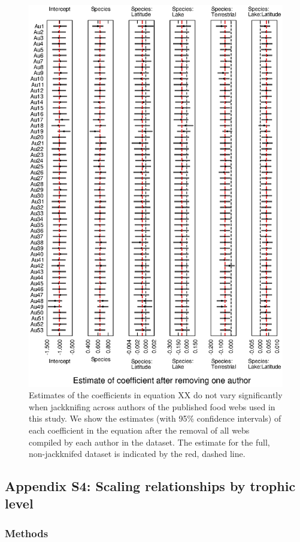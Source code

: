 \documentclass[12pt]{article}
\begin{document}
    \begin{figure}[h]
    \centerline{\includegraphics*[width=.8\textwidth]{Figures/Jackknife/Vul_author.eps}}
    \caption{Estimates of the coefficients in equation XX do not vary significantly
    when jackknifing across authors of the published food webs used in this study. 
    We show the estimates (with 95\% confidence intervals) of each coefficient
    in the equation after the removal of all webs compiled by each author in the dataset.
    The estimate for the full, non-jackknifed dataset is indicated by the red, dashed line.}
    \label{Vul_web}
    \end{figure}


\subsection*{Appendix S4: Scaling relationships by trophic level}

  \subsubsection*{Methods}
\end{document}
